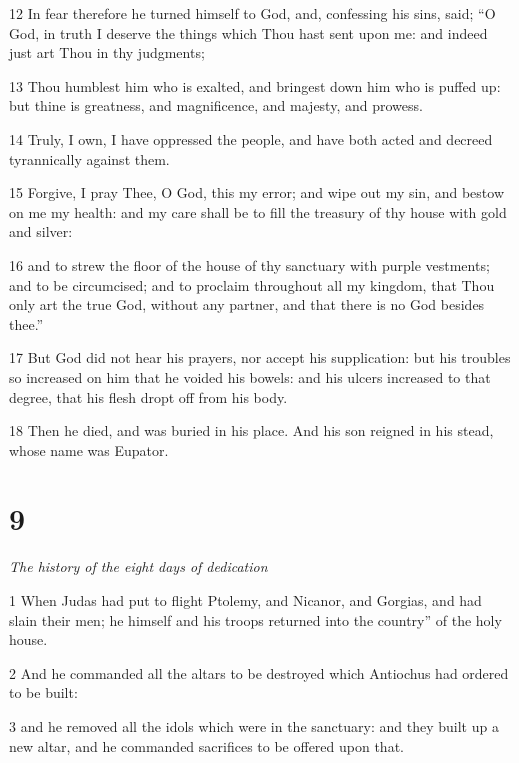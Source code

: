 \par 12 In fear therefore he turned himself to God, and, confessing his sins, said; “O God, in truth I deserve the things which Thou hast sent upon me: and indeed just art Thou in thy judgments; 

\par 13 Thou humblest him who is exalted, and bringest down him who is puffed up: but thine is greatness, and magnificence, and majesty, and prowess. 

\par 14 Truly, I own, I have oppressed the people, and have both acted and decreed tyrannically against them. 

\par 15 Forgive, I pray Thee, O God, this my error; and wipe out my sin, and bestow on me my health: and my care shall be to fill the treasury of thy house with gold and silver: 

\par 16 and to strew the floor of the house of thy sanctuary with purple vestments; and to be circumcised; and to proclaim throughout all my kingdom, that Thou only art the true God, without any partner, and that there is no God besides thee.” 

\par 17 But God did not hear his prayers, nor accept his supplication: but his troubles so increased on him that he voided his bowels: and his ulcers increased to that degree, that his flesh dropt off from his body. 

\par 18 Then he died, and was buried in his place. And his son reigned in his stead, whose name was Eupator.

\chapter{9}

\par \textit{The history of the eight days of dedication}

\par 1 When Judas had put to flight Ptolemy, and Nicanor, and Gorgias, and had slain their men; he himself and his troops returned into the country” of the holy house. 

\par 2 And he commanded all the altars to be destroyed which Antiochus had ordered to be built: 

\par 3 and he removed all the idols which were in the sanctuary: and they built up a new altar, and he commanded sacrifices to be offered upon that. 

